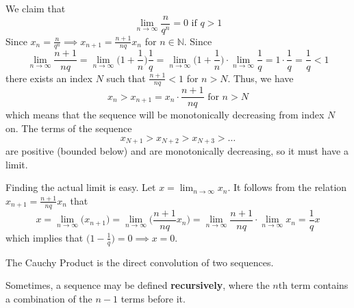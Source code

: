   \begin{example}
    We claim that 
    \begin{equation}
      \lim_{n\rightarrow \infty} \frac{n}{q^n} = 0 \text{ if } q>1
    \end{equation}
    Since $x_n = \frac{n}{q^n} \implies x_{n+1} = \frac{n+1}{nq} x_n$ for $n \in \mathbb{N}$. Since 
    \begin{equation}
      \lim_{n\rightarrow \infty} \frac{n+1}{nq} = \lim_{n \rightarrow \infty} \bigg(1 + \frac{1}{n}\bigg) \frac{1}{q} = \lim_{n\rightarrow \infty} \bigg( 1 + \frac{1}{n} \bigg) \cdot \lim_{n\rightarrow \infty} \frac{1}{q} = 1 \cdot \frac{1}{q} = \frac{1}{q} < 1
    \end{equation}
    there exists an index $N$ such that $\frac{n+1}{nq} < 1$ for $n>N$. Thus, we have 
    \begin{equation}
      x_n > x_{n+1} = x_n \cdot \frac{n+1}{nq} \text{ for } n > N
    \end{equation}
    which means that the sequence will be monotonically decreasing from index $N$ on. The terms of the sequence
    \begin{equation}
      x_{N+1} > x_{N+2} > x_{N+3} > \ldots
    \end{equation}
    are positive (bounded below) and are monotonically decreasing, so it must have a limit. 

    Finding the actual limit is easy. Let $x = \lim_{n \rightarrow \infty} x_n$. It follows from the relation $x_{n+1} = \frac{n+1}{nq} x_n$ that
    \begin{equation}
      x = \lim_{n\rightarrow \infty} \big(x_{n+1}\big) = \lim_{n \rightarrow \infty} \bigg(\frac{n+1}{nq} x_n \bigg) = \lim_{n \rightarrow \infty} \frac{n+1}{nq} \cdot \lim_{n \rightarrow \infty} x_n = \frac{1}{q} x
    \end{equation}
    which implies that $\big( 1 - \frac{1}{q}\big) = 0 \implies x = 0$.
  \end{example}

  \begin{definition}
    The Cauchy Product is the direct convolution of two sequences. 
  \end{definition} 

  \begin{definition}
    Sometimes, a sequence may be defined \textbf{recursively}, where the $n$th term contains a combination of the $n-1$ terms before it.  
  \end{definition}

